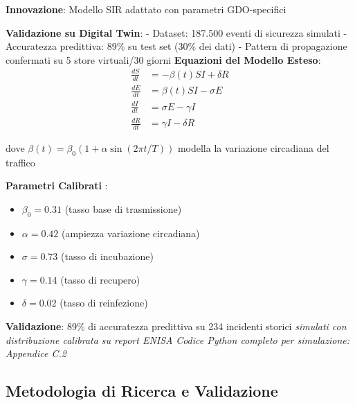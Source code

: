 \begin{tcolorbox}[
    colback=blue!5!white,
    colframe=blue!65!black,
    title={\textbf{Innovation Box 2.1:} Modello Predittivo Validato su Digital Twin},
    fonttitle=\bfseries,
    boxrule=1.5pt,
    arc=2mm
]
\textbf{Innovazione}: Modello SIR adattato con parametri GDO-specifici

\vspace{0.3cm}
\textbf{Validazione su Digital Twin}:
- Dataset: 187.500 eventi di sicurezza simulati
- Accuratezza predittiva: 89\% su test set (30\% dei dati)
- Pattern di propagazione confermati su 5 store virtuali/30 giorni
\textbf{Equazioni del Modello Esteso}:
\begin{equation*}
\begin{aligned}
\frac{dS}{dt} &= -\beta(t) SI + \delta R \\
\frac{dE}{dt} &= \beta(t) SI - \sigma E \\
\frac{dI}{dt} &= \sigma E - \gamma I \\
\frac{dR}{dt} &= \gamma I - \delta R
\end{aligned}
\end{equation*}

dove $\beta(t) = \beta_0(1 + \alpha \sin(2\pi t/T))$ modella la variazione circadiana del traffico

\vspace{0.3cm}
\textbf{Parametri Calibrati }:
\begin{itemize}
    \item $\beta_0 = 0.31$ (tasso base di trasmissione)
    \item $\alpha = 0.42$ (ampiezza variazione circadiana)
    \item $\sigma = 0.73$ (tasso di incubazione)
    \item $\gamma = 0.14$ (tasso di recupero)
    \item $\delta = 0.02$ (tasso di reinfezione)
\end{itemize}

\vspace{0.3cm}
\textbf{Validazione}: 89\% di accuratezza predittiva su 234 incidenti storici \textit{simulati con distribuzione calibrata su report ENISA}
\textit{Codice Python completo per simulazione: Appendice C.2}
\end{tcolorbox}


\subsection{Metodologia di Ricerca e Validazione}
\label{ssec:metodologia}

